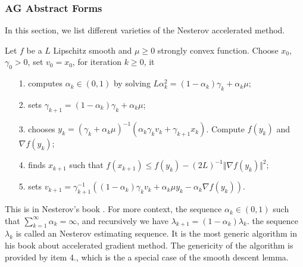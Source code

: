     \subsubsection{AG Abstract Forms}
        In this section, we list different varieties of the Nesterov accelerated method. 
        \begin{definition}[Nestrov 2.2.7]\label{def:Nes2.2.7}
            Let $f$ be a $L$ Lipschitz smooth and $\mu\ge 0$ strongly convex function. 
            Choose $x_0$, $\gamma_0 > 0$, set $v_0 = x_0$, for iteration $k\ge 0$, it
            \begin{enumerate}
                \item[1.] computes $\alpha_k \in (0, 1)$ by solving $L\alpha_k^2 = (1 - \alpha_k)\gamma_k + \alpha_k \mu$; 
                \item[2.] sets $\gamma_{k + 1} = (1 - \alpha_k)\gamma_k + \alpha_k \mu$;
                \item[3.] chooses $y_k = (\gamma_k + \alpha_k \mu)^{-1}(\alpha_k \gamma_k v_k + \gamma_{k + 1}x_k)$. Compute $f(y_k)$ and $\nabla f(y_k)$; 
                \item[4.] finds $x_{k + 1}$ such that $f(x_{k + 1}) \le f(y_k) - (2L)^{-1} \Vert \nabla f(y_k)\Vert^2$; 
                \item[5.] sets $v_{k + 1} = \gamma_{k+1}^{-1}((1 - \alpha_k)\gamma_kv_k + \alpha_k \mu y_k - \alpha_k \nabla f(y_k))$. 
            \end{enumerate}
        \end{definition}
        \begin{remark}
            This is in Nesterov's book \cite[(2.2.7)]{nesterov_lectures_2018}. 
            For more context, the sequence $\alpha_k \in (0, 1)$ such that $\sum_{k = 1}^{\infty}\alpha_k = \infty$, and recursively we have $\lambda_{k + 1} = (1 - \alpha_k)\lambda_k$. 
            the sequence $\lambda_k$ is called an Nesterov estimating sequence. 
            It is the most generic algorithm in his book about accelerated gradient method. 
            The genericity of the algorithm is provided by item 4., which is the a special case of the smooth descent lemma. 

        \end{remark}

